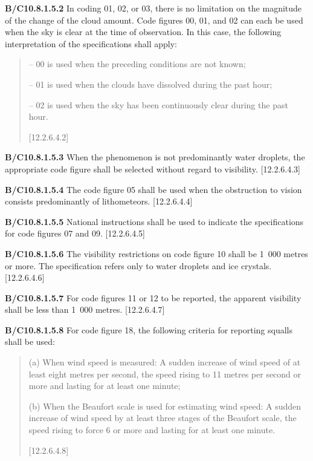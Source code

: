 \textbf{B/C10.8.1.5.2} In coding 01, 02, or 03, there is no limitation on the magnitude of the change of the cloud amount. Code figures 00, 01, and 02 can each be used when the sky is clear at the time of observation. In this case, the following interpretation of the specifications shall apply:

\begin{quote}
-- 00 is used when the preceding conditions are not known;

-- 01 is used when the clouds have dissolved during the past hour;

-- 02 is used when the sky has been continuously clear during the past hour.

{[}12.2.6.4.2{]}
\end{quote}

\textbf{B/C10.8.1.5.3} When the phenomenon is not predominantly water droplets, the appropriate code figure shall be selected without regard to visibility. {[}12.2.6.4.3{]}

\textbf{B/C10.8.1.5.4} The code figure 05 shall be used when the obstruction to vision consists predominantly of lithometeors. {[}12.2.6.4.4{]}

\textbf{B/C10.8.1.5.5} National instructions shall be used to indicate the specifications for code figures 07 and 09. {[}12.2.6.4.5{]}

\textbf{B/C10.8.1.5.6} The visibility restrictions on code figure 10 shall be 1~000 metres or more. The specification refers only to water droplets and ice crystals. {[}12.2.6.4.6{]}

\textbf{B/C10.8.1.5.7} For code figures 11 or 12 to be reported, the apparent visibility shall be less than 1~000 metres. {[}12.2.6.4.7{]}

\textbf{B/C10.8.1.5.8} For code figure 18, the following criteria for reporting squalls shall be used:

\begin{quote}
(a) When wind speed is measured: A sudden increase of wind speed of at least eight metres per second, the speed rising to 11 metres per second or more and lasting for at least one minute;

(b) When the Beaufort scale is used for estimating wind speed: A sudden increase of wind speed by at least three stages of the Beaufort scale, the speed rising to force 6 or more and lasting for at least one minute.

{[}12.2.6.4.8{]}
\end{quote}

